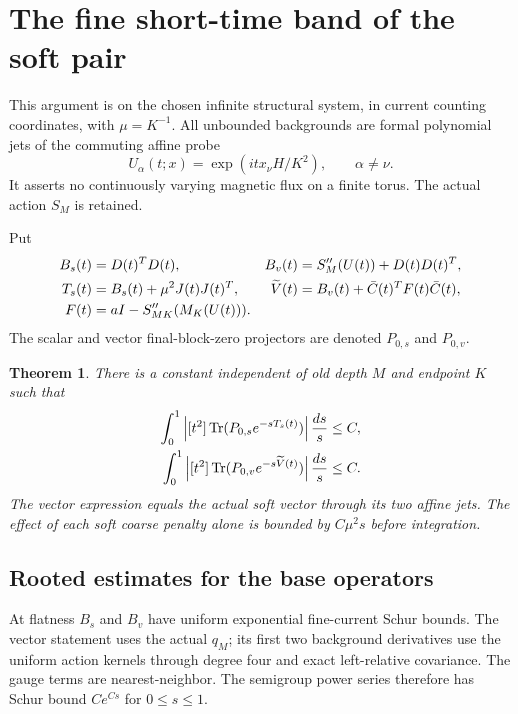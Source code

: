 \documentclass[11pt]{article}
\newtheorem{theorem}{Theorem}[section]
\theoremstyle{remark}
\begin{document}
\section{The fine short-time band of the soft pair}
\label{suv-section}

This argument is on the chosen infinite structural system, in current
counting coordinates, with $\mu=K^{-1}$. All unbounded backgrounds are
formal polynomial jets of the commuting affine probe
\[
 U_\alpha(t;x)=\exp(i t x_\nu H/K^2),\qquad \alpha\ne\nu.
\]
It asserts no continuously varying magnetic flux on a finite torus.
The actual action $S_M$ is retained.

Put
\begin{align}
 B_s(t)&=D(t)^TD(t),&
 B_v(t)&=S_M''(U(t))+D(t)D(t)^T,\notag\\
 T_s(t)&=B_s(t)+\mu^2J(t)J(t)^T,&
 \widetilde V(t)&=B_v(t)+\bar C(t)^TF(t)\bar C(t),\notag\\
 F(t)&=aI-S_{MK}''(M_K(U(t))).
 \label{suv-operators}
\end{align}
The scalar and vector final-block-zero projectors are denoted
$P_{0,s}$ and $P_{0,v}$.

\begin{theorem}
\label{suv-main}
There is a constant independent of old depth $M$ and endpoint $K$ such
that
\begin{align}
 \int_0^1\left|[t^2]\operatorname{Tr}
       (P_{0,s}e^{-sT_s(t)})\right|\frac{ds}{s}&\le C,\notag\\
 \int_0^1\left|[t^2]\operatorname{Tr}
       (P_{0,v}e^{-s\widetilde V(t)})\right|\frac{ds}{s}&\le C.
 \label{suv-bounds}
\end{align}
The vector expression equals the actual soft vector through its two
affine jets. The effect of each soft coarse penalty alone is bounded
by $C\mu^2s$ before integration.
\end{theorem}

\subsection{Rooted estimates for the base operators}
\label{suv-base-section}

At flatness $B_s$ and $B_v$ have uniform exponential fine-current
Schur bounds. The vector statement uses the actual $q_M$; its first
two background derivatives use the uniform action kernels through
degree four and exact left-relative covariance. The gauge terms
are nearest-neighbor. The semigroup power series therefore has
Schur bound $Ce^{Cs}$ for $0\le s\le1$.
\end{document}
